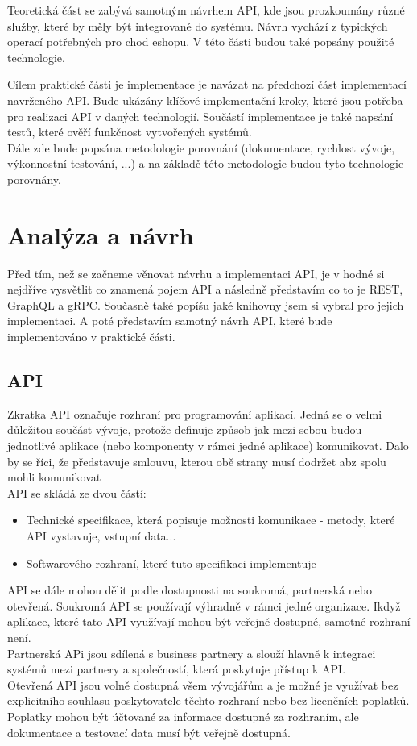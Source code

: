 \documentclass[thesis=M,czech]{FITthesis}[2019/12/23]
\begin{document}
Teoretická část se zabývá samotným návrhem API, kde jsou prozkoumány různé služby, které by měly být integrované do systému. Návrh vychází z typických operací potřebných pro chod eshopu. V této části budou také popsány použité technologie.

Cílem praktické části je implementace je navázat na předchozí část implementací navrženého API. Bude ukázány klíčové implementační kroky, které jsou potřeba pro realizaci API v daných technologií. Součástí implementace je také napsání testů, které ověří funkčnost vytvořených systémů.\\
Dále zde bude popsána metodologie porovnání (dokumentace, rychlost vývoje, výkonnostní testování, ...) a na základě této metodologie budou tyto technologie porovnány.



\chapter{Analýza a návrh}
Před tím, než se začneme věnovat návrhu a implementaci API, je v hodné si nejdříve vysvětlit co znamená pojem API a následně představím co to je REST, GraphQL a gRPC. Současně také popíšu jaké knihovny jsem si vybral pro jejich implementaci. A poté představím samotný návrh API, které bude implementováno v praktické části.

\section{API}
Zkratka API označuje rozhraní pro programování aplikací. Jedná se o velmi důležitou součást vývoje, protože definuje způsob jak mezi sebou budou jednotlivé aplikace (nebo komponenty v rámci jedné aplikace) komunikovat. Dalo by se říci, že představuje smlouvu, kterou obě strany musí dodržet abz spolu mohli komunikovat\\
API se skládá ze dvou částí: 
\begin{itemize}
    \item Technické specifikace, která popisuje možnosti komunikace - metody, které API vystavuje, vstupní data...
    \item Softwarového rozhraní, které tuto specifikaci implementuje
\end{itemize}

API se dále mohou dělit podle dostupnosti na soukromá, partnerská nebo otevřená. Soukromá API se používají výhradně v rámci jedné organizace. Ikdyž aplikace, které tato API využívají mohou být veřejně dostupné, samotné rozhraní není.\\
Partnerská APi jsou sdílená s business partnery a slouží hlavně k integraci systémů mezi partnery a společností, která poskytuje přístup k API.\\
Otevřená API jsou volně dostupná všem vývojářům a je možné je využívat bez explicitního souhlasu poskytovatele těchto rozhraní nebo bez licenčních poplatků. Poplatky mohou být účtované za informace dostupné za rozhraním, ale dokumentace  a testovací data musí být veřejně dostupná.
\end{document}
